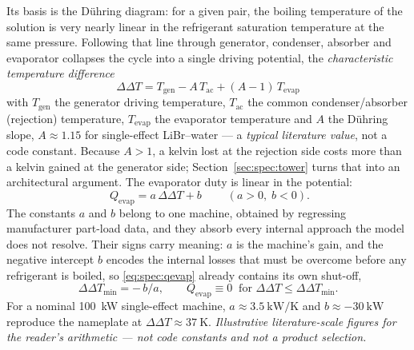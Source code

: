 \documentclass[11pt]{article}
\begin{document}
Its basis is the D\"uhring diagram: for a given pair, the boiling temperature of the solution is very
nearly linear in the refrigerant saturation temperature at the same pressure. Following that line
through generator, condenser, absorber and evaporator collapses the cycle into a single driving
potential, the \emph{characteristic temperature difference}
\begin{equation}
\boxed{\;\Delta\Delta T = T_{\mathrm{gen}} - A\,T_{\mathrm{ac}} + (A-1)\,T_{\mathrm{evap}}\;}
\label{eq:spec:ddt}
\end{equation}
with $T_{\mathrm{gen}}$ the generator driving temperature, $T_{\mathrm{ac}}$ the common
condenser/absorber (rejection) temperature, $T_{\mathrm{evap}}$ the evaporator temperature and $A$ the
D\"uhring slope, $A\approx1.15$ for single-effect LiBr--water --- a \emph{typical literature value},
not a code constant. Because $A>1$, a kelvin lost at the rejection side costs more than a kelvin
gained at the generator side; Section~\ref{sec:spec:tower} turns that into an architectural argument.
The evaporator duty is linear in the potential:
\begin{equation}
\boxed{\;Q_{\mathrm{evap}} = a\,\Delta\Delta T + b\;}\qquad (a>0,\;b<0) .
\label{eq:spec:qevap}
\end{equation}
The constants $a$ and $b$ belong to one machine, obtained by regressing manufacturer part-load data,
and they absorb every internal approach the model does not resolve. Their signs carry meaning: $a$ is
the machine's gain, and the negative intercept $b$ encodes the internal losses that must be overcome
before any refrigerant is boiled, so \eqref{eq:spec:qevap} already contains its own shut-off,
\begin{equation}
\Delta\Delta T_{\min} = -\,b/a ,
\qquad Q_{\mathrm{evap}}\equiv 0 \ \text{ for } \Delta\Delta T \le \Delta\Delta T_{\min} .
\label{eq:spec:ddtmin}
\end{equation}
For a nominal \SI{100}{\kilo\watt} single-effect machine, $a\approx\SI{3.5}{\kilo\watt\per\kelvin}$
and $b\approx\SI{-30}{\kilo\watt}$ reproduce the nameplate at $\Delta\Delta T\approx\SI{37}{\kelvin}$.
\emph{Illustrative literature-scale figures for the reader's arithmetic --- not code constants and not
a product selection.}
\end{document}

